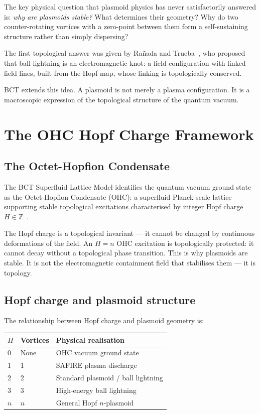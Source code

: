 \documentclass[12pt,twocolumn]{article}
\begin{document}
The key physical question that plasmoid physics has never
satisfactorily answered is: \textit{why are plasmoids stable?}
What determines their geometry? Why do two counter-rotating
vortices with a zero-point between them form a self-sustaining
structure rather than simply dispersing?

The first topological answer was given by Ra\~{n}ada and
Trueba~\cite{RanadaTrueba1996}, who proposed that ball
lightning is an electromagnetic knot: a field configuration
with linked field lines, built from the Hopf map, whose
linking is topologically conserved.

BCT extends this idea. A plasmoid is not merely a plasma
configuration. It is a macroscopic expression of the
topological structure of the quantum vacuum.

\section{The OHC Hopf Charge Framework}

\subsection{The Octet-Hopfion Condensate}

The BCT Superfluid Lattice Model identifies the quantum vacuum
ground state as the Octet-Hopfion Condensate (OHC): a
superfluid Planck-scale lattice supporting stable topological
excitations characterised by integer Hopf charge
$H \in \mathbb{Z}$~\cite{BCT_AppJH}.

The Hopf charge is a topological invariant --- it cannot be
changed by continuous deformations of the field. An $H = n$
OHC excitation is topologically protected: it cannot decay
without a topological phase transition. This is why plasmoids
are stable. It is not the electromagnetic containment field
that stabilises them --- it is topology.

\subsection{Hopf charge and plasmoid structure}

The relationship between Hopf charge and plasmoid geometry
is:

\begin{center}
{\small
\begin{tabular}{@{}p{1.2cm}p{1.5cm}p{2.8cm}@{}}
\toprule
$H$ & Vortices & Physical realisation \\
\midrule
0 & None & OHC vacuum ground state \\
1 & 1 & SAFIRE plasma discharge \\
2 & 2 & Standard plasmoid / ball lightning \\
3 & 3 & High-energy ball lightning \\
$n$ & $n$ & General Hopf $n$-plasmoid \\
\bottomrule
\end{tabular}}
\end{center}
\end{document}
